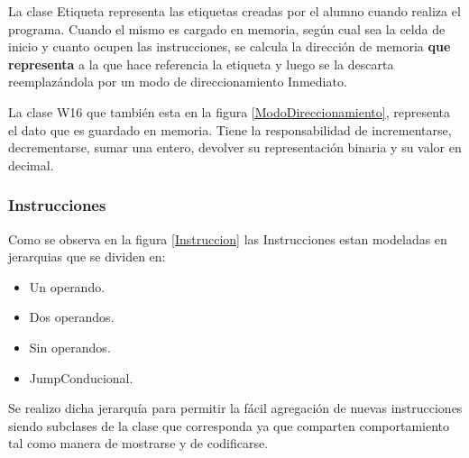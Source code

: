 La clase Etiqueta representa las etiquetas creadas por el alumno cuando realiza el programa. Cuando el mismo es cargado en memoria, según cual sea la celda de inicio y cuanto ocupen las instrucciones, se calcula la dirección de memoria \textbf{que representa }{a la que hace referencia} la etiqueta y luego se la descarta reemplazándola por un modo de direccionamiento Inmediato.

La clase W16 que también esta en la figura \ref{ModoDireccionamiento}, representa el dato que es guardado en memoria. Tiene la responsabilidad de incrementarse, decrementarse, sumar una entero, devolver su representación binaria y su valor en decimal.



\subsubsection{Instrucciones}
Como se observa en la figura \ref{Instruccion} las Instrucciones estan modeladas en jerarquias que se dividen en:

\begin{itemize}
\item Un operando.
\item Dos operandos.
\item Sin operandos.
\item JumpConducional.
\end{itemize}

Se realizo dicha jerarquía para permitir la fácil agregación de nuevas instrucciones siendo subclases de la clase que corresponda ya que comparten comportamiento tal como manera de mostrarse y de codificarse.


